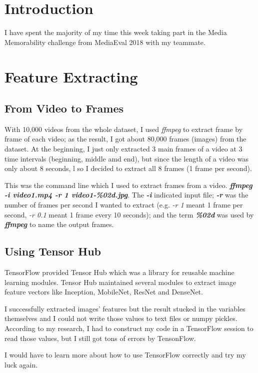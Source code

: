 \section{Introduction}
I have spent the majority of my time this week taking part in the Media Memorability challenge from MediaEval 2018 with my teammate.

\section{Feature Extracting}
\subsection{From Video to Frames}
With 10,000 videos from the whole dataset, I used \emph{ffmpeg} to extract frame by frame of each video; as the result, I got about 80,000 frames (images) from the dataset. At the beginning, I just only extracted 3 main frames of a video at 3 time intervals (beginning, middle amd end),  but since the length of a video was only about 8 seconds, l so I decided to extract all 8 frames (1 frame per second).

This was the command line which I used to extract frames from a video. \textbf{\emph{ffmpeg -i video1.mp4 -r 1 video1-\%02d.jpg}}. The \textbf{\emph{-i}} indicated input file; \textbf{\emph{-r}} was the number of frames per second I wanted to extract (e.g. \emph{-r 1} meant 1 frame per second,  \emph{-r 0.1} meant 1 frame every 10 seconds); and the term \textbf{\emph{\%02d}} was used by \textbf{\emph{ffmpeg}} to name the output frames.

\subsection{Using Tensor Hub}
TensorFlow\cite{tensorflow} provided Tensor Hub which was a library for reusable machine learning modules. Tensor Hub maintained several modules to extract image feature vectors like Inception, MobileNet, ResNet and DenseNet.

I successfully extracted images' features but the result stucked in the variables themselves and I could not write those values to text files or numpy pickles. According to my research, I had to construct my code in a TensorFlow session to read those values, but I still got tons of errors by TensonFlow.

I would have to learn more about how to use TensorFlow correctly and try my luck again.

